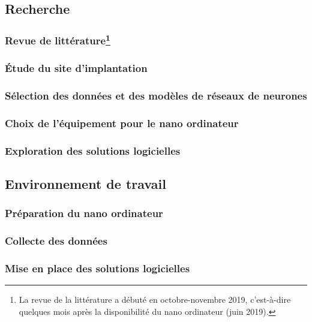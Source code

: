 \subsection{Recherche}

\subsubsection[Revue de littérature]{Revue de littérature\footnote{La revue de la littérature a débuté en octobre-novembre 2019, c'est-à-dire quelques mois après la disponibilité du nano ordinateur (juin 2019).}}

\subsubsection{Étude du site d'implantation}

\subsubsection{Sélection des données et des modèles de réseaux de neurones}

\subsubsection{Choix de l'équipement pour le nano ordinateur}

\subsubsection{Exploration des solutions logicielles}

\subsection{Environnement de travail}

\subsubsection{Préparation du nano ordinateur}
\label{preparation_nano_ordinateur}
\subsubsection{Collecte des données}
\label{section:collecte_donnees}
\subsubsection{Mise en place des solutions logicielles}

